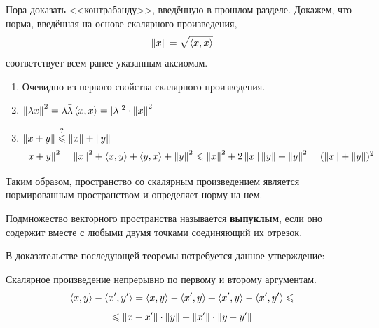\documentclass[12pt]{article}
\begin{document}

		    Пора доказать <<контрабанду>>, введённую в прошлом разделе. Докажем, что норма, введённая на основе скалярного произведения, 
		$$\left\| x \right\| = \sqrt{\left\langle x, x \right\rangle}$$
		соответствует всем ранее указанным аксиомам.

		\begin{enumerate}
		\item Очевидно из первого свойства скалярного произведения.
		\item $\left\| \lambda x \right\|^2 = \lambda \bar{\lambda} \left\langle x, x \right\rangle = | \lambda |^2 \cdot \left\| x \right\|^2$
		\item $\left\| x+y \right\| \overset{?}{\leqslant} \left\| x \right\| + \left\| y \right\|$
			  $$\left\| x + y \right\|^2 = \left\| x \right\|^2 + \left\langle x, y \right\rangle + \left\langle y, x \right\rangle + \left\| y \right\|^2 \leqslant \left\| x \right\|^2 + 2 \left\| x \right\| \left\| y \right\| + \left\| y \right\|^2
				= (\left\| x \right\| + \left\| y \right\|)^2
			  $$
		\end{enumerate}
		Таким образом, пространство со скалярным произведением является нормированным пространством и определяет норму на нем.
	
		\begin{defi}
			Подмножество векторного пространства называется \textbf{выпуклым}, если оно содержит вместе с любыми двумя 
			точками соединяющий их отрезок.
		\end{defi}

		В доказательстве последующей теоремы потребуется данное утверждение:
		\begin{state}
			Скалярное произведение непрерывно по первому и второму аргументам.
			$$\left\langle x, y \right\rangle - \left\langle x', y' \right\rangle = \left\langle x, y \right\rangle - \left\langle x', y \right\rangle + \left\langle x', y \right\rangle - \left\langle x', y' \right\rangle \leqslant$$
			$$\leqslant \left\| x - x' \right\|\cdot \left\| y \right\| + \left\| x' \right\| \cdot \left\| y - y' \right\|$$
		\end{state}
	
\end{document}
